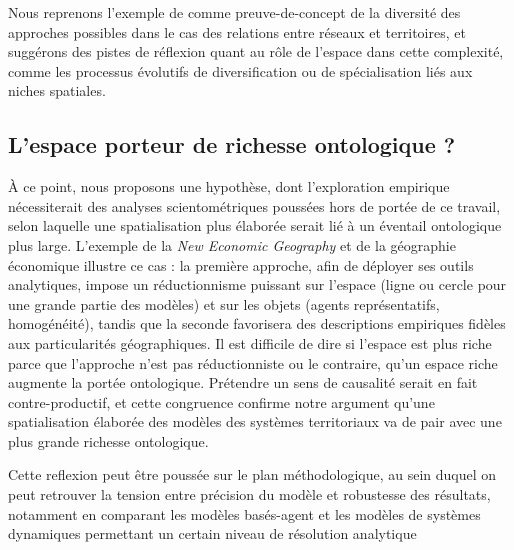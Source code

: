 \documentclass[11pt]{article}
\begin{document}
Nous reprenons l'exemple de \citep{raimbault2017invisible} comme preuve-de-concept de la diversité des approches possibles dans le cas des relations entre réseaux et territoires, et suggérons des pistes de réflexion quant au rôle de l'espace dans cette complexité, comme les processus évolutifs de diversification ou de spécialisation liés aux niches spatiales.





\subsection{L'espace porteur de richesse ontologique ?}

À ce point, nous proposons une hypothèse, dont l'exploration empirique nécessiterait des analyses scientométriques poussées hors de portée de ce travail, selon laquelle une spatialisation plus élaborée serait lié à un éventail ontologique plus large. L'exemple de la \emph{New Economic Geography} et de la géographie économique illustre ce cas \cite{marchionni2004geographical}: la première approche, afin de déployer ses outils analytiques, impose un réductionnisme puissant sur l'espace (ligne ou cercle pour une grande partie des modèles) et sur les objets (agents représentatifs, homogénéité), tandis que la seconde favorisera des descriptions empiriques fidèles aux particularités géographiques. Il est difficile de dire si l'espace est plus riche parce que l'approche n'est pas réductionniste ou le contraire, qu'un espace riche augmente la portée ontologique. Prétendre un sens de causalité serait en fait contre-productif, et cette congruence confirme notre argument qu'une spatialisation élaborée des modèles des systèmes territoriaux va de pair avec une plus grande richesse ontologique.

Cette reflexion peut être poussée sur le plan méthodologique, au sein duquel on peut retrouver la tension entre précision du modèle et robustesse des résultats, notamment en comparant les modèles basés-agent et les modèles de systèmes dynamiques permettant un certain niveau de résolution analytique

\end{document}
